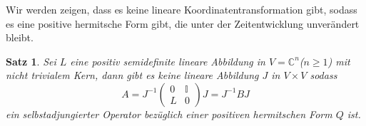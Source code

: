 \documentclass[11pt,a4paper,leqno]{report}
\newtheorem{proposition}{Satz}[chapter]
\numberwithin{equation}{chapter}
\begin{document}
Wir werden zeigen, dass es keine lineare Koordinatentransformation gibt, sodass es eine positive hermitsche Form gibt, die unter der Zeitentwicklung unver\"andert bleibt.
\begin{proposition}
	Sei $L$ eine positiv semidefinite lineare Abbildung in $V=\mathbb{C}^n$($n\geq 1$) mit nicht trivialem Kern, dann gibt es keine lineare Abbildung $J$ in $V\times V$ sodass
	\begin{equation}
		A=J^{-1}\begin{pmatrix}
			0 & \mathbb{I} \\ 
			L & 0
		\end{pmatrix}J=J^{-1}BJ\label{eq:jaco}
	\end{equation}
	ein selbstadjungierter Operator bez\"uglich einer positiven hermitschen Form $Q$ ist.
\end{proposition}
\end{document}
